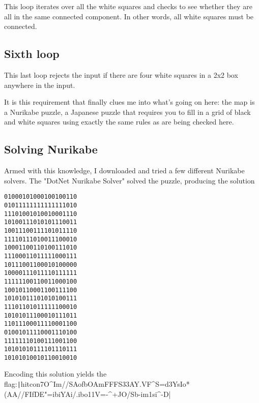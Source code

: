 \documentclass[a4paper,UTF8]{ctexart}
\begin{document}
  This loop iterates over all the white squares and checks to see whether they are all in the same connected
component. In other words, all white squares must be connected.

  \subsection{Sixth loop}

  This last loop rejects the input if there are four white squares in a 2x2 box anywhere in the input.

  It is this requirement that finally clues me into what's going on here: the map is a Nurikabe puzzle, a
Japanese puzzle that requires you to fill in a grid of black and white squares using exactly the same rules as
are being checked here.
  \subsection{Solving Nurikabe}
  Armed with this knowledge, I downloaded and tried a few different Nurikabe solvers. The "DotNet Nurikabe
Solver" solved the puzzle, producing the solution

\begin{verbatim}
01000101000100100110
01011111111111111010
11101001010010001110
10100111010101110011
10011100111101011110
11110111010011100010
10001100110100111010
11100011011111000111
10111001100010100000
10000111011110111111
11111100110011000100
10010110001100111100
10101011101010100111
11101101011111100010
10101011100010111011
11011100011110001100
01001011110001110100
11111110100111001100
10101010111101110111
10101010010110010010
\end{verbatim}
  
  Encoding this solution yields the flag:\texttt|hitcon{7O^Im//SAofbOAmFFFS33AY.VF^S=d3YsIo*
  (AA//FIfDE"=ibiYAi/.ibo11V=-^+JO/Sb-im1si^-D}|
  
\end{document}
